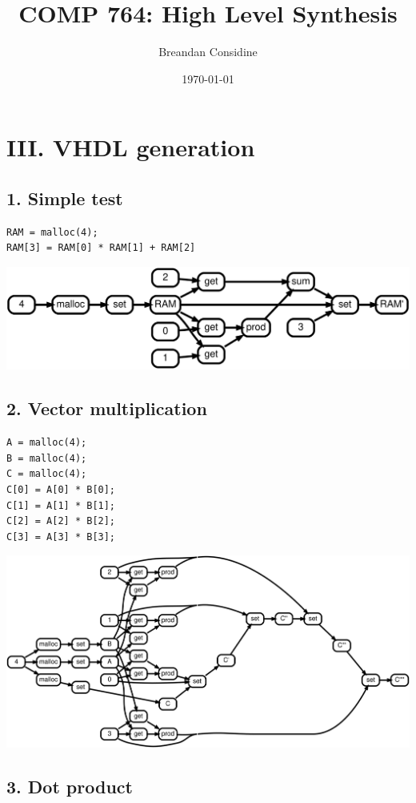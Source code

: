 \documentclass[11pt]{article}
\title{COMP 764: High Level Synthesis}
\date{\today}
\author{Breandan Considine}
\begin{document}
    \maketitle

\section*{III. VHDL generation}
\subsection*{1. Simple test}

\begin{lstlisting}
RAM = malloc(4);
RAM[3] = RAM[0] * RAM[1] + RAM[2]
\end{lstlisting}

\includegraphics[scale=0.25]{rtd31}

\pagebreak\subsection*{2. Vector multiplication}

\begin{lstlisting}
A = malloc(4);
B = malloc(4);
C = malloc(4);
C[0] = A[0] * B[0];
C[1] = A[1] * B[1];
C[2] = A[2] * B[2];
C[3] = A[3] * B[3];
\end{lstlisting}

\includegraphics[scale=0.25]{rtd32}

\pagebreak\subsection*{3. Dot product}
\end{document}
